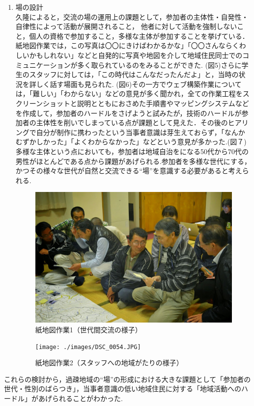 \documentclass[a4paper]{jsarticle}
\begin{document}
\begin{enumerate}
\item 場の設計\\
久隆によると，交流の場の運用上の課題として，参加者の主体性・自発性・自律性によって活動が展開されること， 他者に対して活動を強制しないこと，個人の資格で参加すること，多様な主体が参加することを挙げている．\cite{16}紙地図作業では，この写真は〇〇にきけばわかるかな」「〇〇さんならくわしいかもしれない」などと自発的に写真や地図を介して地域住民同士でのコミュニケーションが多く取られているのをみることができた. (図5)さらに学生のスタッフに対しては，「この時代はこんなだったんだよ」と，当時の状況を詳しく話す場面も見られた. (図6)その一方でウェブ構築作業については，「難しい」「わからない」などの意見が多く聞かれ，全ての作業工程をスクリーンショットと説明とともにおさめた手順書やマッピングシステムなどを作成して，参加者のハードルをさげようと試みたが，技術のハードルが参加者の主体性を削いでしまっている点が課題として見えた．その後のヒアリングで自分が制作に携わったという当事者意識は芽生えておらず，「なんかむずかしかった」「よくわからなかった」などという意見が多かった.(図７)
多様な主体という点においても，参加者は地域自治をになる50代から70代の男性がほとんどである点から課題があげられる.参加者を多様な世代にする，かつその様々な世代が自然と交流できる“場”を意識する必要があると考えられる.\par

\begin{figure}[H]
  \begin{center}
    \includegraphics[width=0.8\hsize]{./images/komenoma-2.png}
    \caption{紙地図作業1（世代間交流の様子）}
    \label{fig:tmu_hino}
  \end{center}
\end{figure}
\begin{figure}[H]
  \begin{center}
    \texttt{[image: ./images/DSC\_0054.JPG]}
    \caption{紙地図作業2（スタッフへの地域がたりの様子）}
    \label{fig:tmu_hino}
  \end{center}
\end{figure}

\end{enumerate}
これらの検討から，過疎地域の“場”の形成における大きな課題として「参加者の世代・性別のばらつき」，当事者意識の低い地域住民に対する「地域活動へのハードル」があげられることがわかった.
\end{document}
